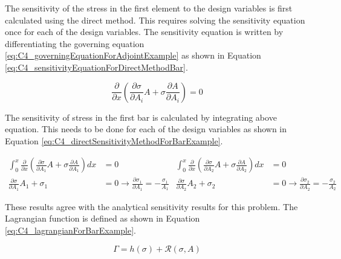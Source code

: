 The sensitivity of the stress in the first element to the design variables is first calculated using the direct method. This requires solving the sensitivity equation once for each of the design variables. The sensitivity equation is written by differentiating the governing equation \eqref{eq:C4_governingEquationForAdjointExample} as shown in Equation \eqref{eq:C4_sensitivityEquationForDirectMethodBar}.

\begin{equation}\label{eq:C4_sensitivityEquationForDirectMethodBar}
    \frac{\partial}{\partial x}
    \left(
    \frac{\partial \sigma}{\partial A_i} A + \sigma \frac{\partial A}{\partial A_i}
    \right) = 0
\end{equation}

The sensitivity of stress in the first bar is calculated by integrating above equation. This needs to be done for each of the design variables as shown in Equation \eqref{eq:C4_directSensitivityMethodForBarExample}.

\begin{subequations}\label{eq:C4_directSensitivityMethodForBarExample}
\begin{align}
    \int_0^x
    \frac{\partial}{\partial x}
    \left(
    \frac{\partial \sigma}{\partial A_1} A + \sigma \frac{\partial A}{\partial A_1}
    \right) dx &= 0 \nonumber \\
    \frac{\partial \sigma}{\partial A_1} A_1 + \sigma_1 &= 0 \rightarrow 
    \frac{\partial \sigma_1}{\partial A_1} = -\frac{\sigma_1}{A_1}
\end{align}
\begin{align}
    \int_0^x
    \frac{\partial}{\partial x}
    \left(
    \frac{\partial \sigma}{\partial A_2} A + \sigma \frac{\partial A}{\partial A_2}
    \right) dx &= 0 \nonumber \\
    \frac{\partial \sigma}{\partial A_2} A_2 + \sigma_2 &= 0 \rightarrow 
    \frac{\partial \sigma_2}{\partial A_2} = -\frac{\sigma_2}{A_2}
\end{align}
\end{subequations}

These results agree with the analytical sensitivity results for this problem. The Lagrangian function is defined as shown in Equation \eqref{eq:C4_lagrangianForBarExample}.

\begin{equation}\label{eq:C4_lagrangianForBarExample}
    \Gamma = h(\sigma) + \mathcal{R}(\sigma, A)
\end{equation}

